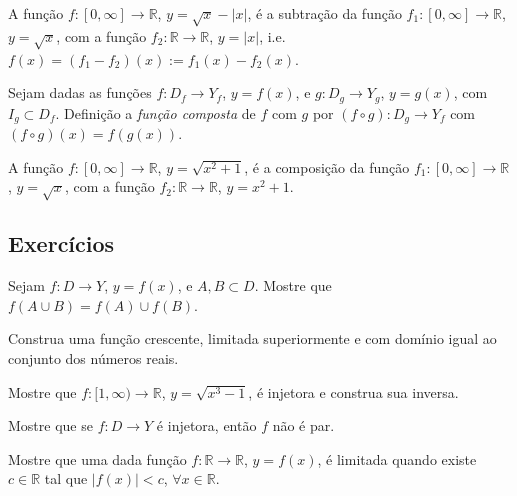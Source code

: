 \begin{ex}
  A função $f:[0, \infty]\to\mathbb{R}$, $y = \sqrt{x} - |x|$, é a subtração da função $f_1:[0, \infty]\to\mathbb{R}$, $y = \sqrt{x}$, com a função $f_2:\mathbb{R}\to\mathbb{R}$, $y = |x|$, i.e. $f(x) = (f_1-f_2)(x):= f_1(x) - f_2(x)$.
\end{ex}

\begin{defn}
  Sejam dadas as funções $f:D_f\to Y_f$, $y = f(x)$, e $g:D_g\to Y_g$, $y = g(x)$, com $I_g\subset D_f$. Definição a \emph{função composta} de $f$ com $g$ por $(f\circ g):D_g\to Y_f$ com $(f\circ g)(x) = f\left(g(x)\right)$.
\end{defn}

\begin{ex}
  A função $f:[0, \infty]\to\mathbb{R}$, $y=\sqrt{x^2 + 1}$, é a composição da função $f_1:[0, \infty]\to\mathbb{R}$, $y = \sqrt{x}$, com a função $f_2:\mathbb{R}\to\mathbb{R}$, $y = x^2+1$.
\end{ex}

\subsection*{Exercícios}

\begin{exer}
  Sejam $f:D\to Y$, $y=f(x)$, e $A, B \subset D$. Mostre que $f(A\cup B) = f(A)\cup f(B)$.
\end{exer}

\begin{exer}
  Construa uma função crescente, limitada superiormente e com domínio igual ao conjunto dos números reais.
\end{exer}

\begin{exer}
  Mostre que $f:[1, \infty)\to \mathbb{R}$, $y = \sqrt{x^3 - 1}$, é injetora e construa sua inversa.
\end{exer}

\begin{exer}
  Mostre que se $f:D\to Y$ é injetora, então $f$ não é par.
\end{exer}

\begin{exer}
  Mostre que uma dada função $f:\mathbb{R}\to\mathbb{R}$, $y = f(x)$, é limitada quando existe $c\in\mathbb{R}$ tal que $|f(x)|<c$, $\forall x\in\mathbb{R}$.
\end{exer}
